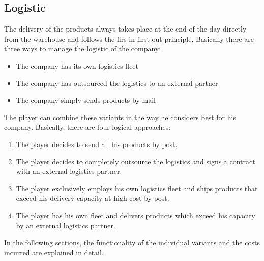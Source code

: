 \subsection{Logistic} \label{logistic_simulation}

The delivery of the products always takes place at the end of the day directly from the warehouse and follows the firs in first out principle. Basically there are three ways to manage the logistic of the company: 
\begin{itemize}
    \item The company has its own logistics fleet
    \item The company has outsourced the logistics to an external partner
    \item The company simply sends products by mail
\end{itemize}

The player can combine these variants in the way he considers best for his company. Basically, there are four logical approaches:
\begin{enumerate}
    \item The player decides to send all his products by post.
    \item The player decides to completely outsource the logistics and signs a contract with an external logistics partner.
    \item The player exclusively employs his own logistics fleet and ships products that exceed his delivery capacity at high cost by post.
    \item The player has his own fleet and delivers products which exceed his capacity by an external logistics partner.
\end{enumerate}
	
In the following sections, the functionality of the individual variants and the costs incurred are explained in detail.


